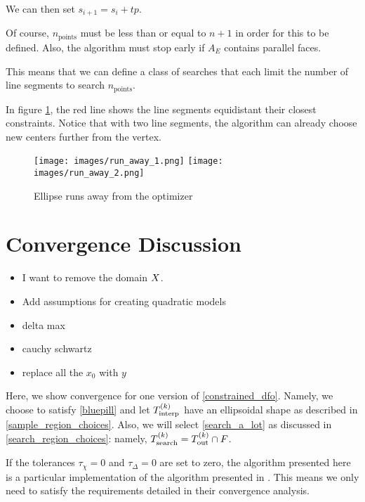 We can then set $s_{i+1} = s_{i} + t p$.

Of course, $n_{\text{points}}$ must be less than or equal to $n + 1$ in order for this to be defined.
Also, the algorithm must stop early if $A_E$ contains parallel faces.



This means that we can define a class of searches that each limit the number of line segments to search $n_{\text{points}}$.

In figure \cref{line_can_run}, the red line shows the line segments equidistant their closest constraints.
Notice that with two line segments, the algorithm can already choose new centers further from the vertex.

\begin{figure}[h]
    \centering
    \texttt{[image: images/run\_away\_1.png]}
    \texttt{[image: images/run\_away\_2.png]}
    \caption{Ellipse runs away from the optimizer}
    \label{line_can_run}
\end{figure}




\section{Convergence Discussion}
\color{red}
\begin{itemize}
\item I want to remove the domain $X$.
\item Add assumptions for creating quadratic models
\item delta max
\item cauchy schwartz
\item replace all the $x_0$ with $y$
\end{itemize}
\color{black}


\label{convergence_discussion}

Here, we show convergence for one version of \cref{constrained_dfo}.
Namely, we choose to satisfy \cref{bluepill} and let ${T_{\text{interp}}^{(k)}}$ have an ellipsoidal shape as described in \cref{sample_region_choices}. 
Also, we will select \cref{search_a_lot} as discussed in \cref{search_region_choices}: namely, ${T_{\text{search}}^{(k)}} = {T_{\text{out}}^{(k)}} \cap {F}$.

If the tolerances $\tau_{\chi} = 0$ and $\tau_{\Delta} = 0$ are set to zero, the algorithm presented here is a particular implementation of the algorithm presented in \cite{doi:10.1080/10556788.2015.1026968}.
This means we only need to satisfy the requirements detailed in their convergence analysis.


